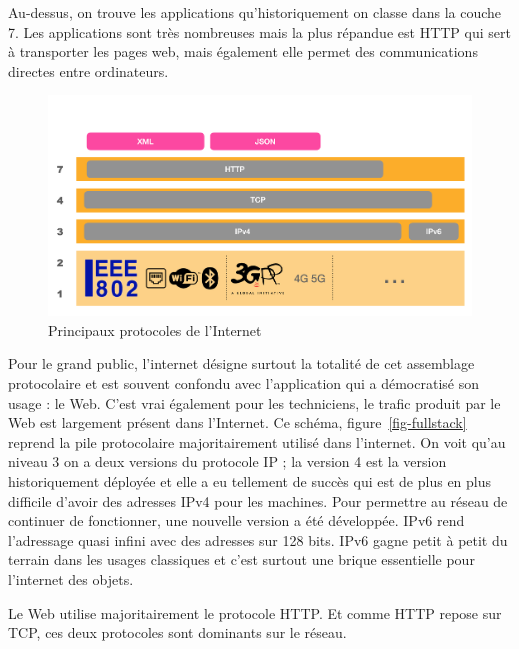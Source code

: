     \vspace{1em}

  
  Au-dessus, on trouve les applications qu'historiquement on classe dans la couche 7. Les applications sont très nombreuses mais la plus répandue est \ac{HTTP} qui sert à transporter les pages web, mais également elle permet des communications directes entre ordinateurs. 
  
  
    \vspace{1em}


   \begin{figure}[tbp]
\centerline{\includegraphics[width=1\columnwidth]{Pictures/fullIPstack.png}}
\caption{Principaux protocoles de l'Internet}
\label{fig-fullstack}
\end{figure}

  Pour le grand public, l’internet désigne surtout la totalité de cet assemblage protocolaire et est souvent confondu avec l’application qui a démocratisé son usage : le Web.  C'est vrai également pour les techniciens, le trafic produit par le Web est largement présent dans l'Internet. Ce schéma, figure~\vref{fig-fullstack} reprend la pile protocolaire majoritairement utilisé dans l'internet. On voit qu'au niveau 3 on a deux versions du protocole \ac{IP} ; la version 4 est la version historiquement déployée et elle a eu tellement de succès qui est de plus en plus difficile d'avoir des adresses \ac{IPv4} pour les machines. Pour permettre au réseau de continuer de fonctionner, une nouvelle version a été développée. \ac{IPv6} rend l'adressage quasi infini avec des adresses sur 128 bits. \ac{IPv6} gagne petit à petit du terrain dans les usages classiques et c'est surtout une brique essentielle pour l'internet des objets. 
  
  Le Web utilise majoritairement le protocole \ac{HTTP}. Et comme \ac{HTTP} repose sur \ac{TCP}, ces deux protocoles sont dominants sur le réseau. 
  
